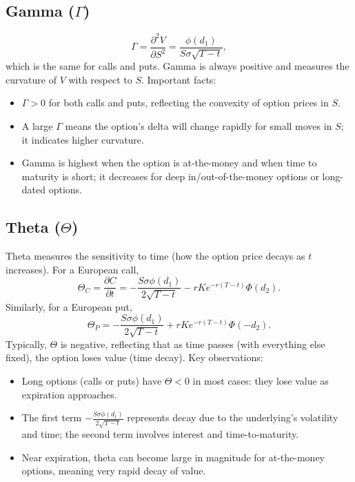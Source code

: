 \subsection{Gamma (\(\Gamma\))}
\[
\Gamma = \frac{\partial^2 V}{\partial S^2} 
= \frac{\phi(d_1)}{S \sigma \sqrt{T-t}},
\]
which is the same for calls and puts.  Gamma is always positive and measures the curvature of \(V\) with respect to \(S\).  Important facts:
\begin{itemize}
    \item \(\Gamma > 0\) for both calls and puts, reflecting the convexity of option prices in \(S\).
    \item A large \(\Gamma\) means the option's delta will change rapidly for small moves in \(S\); it indicates higher curvature.
    \item Gamma is highest when the option is at-the-money and when time to maturity is short; it decreases for deep in/out-of-the-money options or long-dated options.
\end{itemize}

\subsection{Theta (\(\Theta\))}
Theta measures the sensitivity to time (how the option price decays as \(t\) increases).  For a European call,
\[
\Theta_C = \frac{\partial C}{\partial t}
= -\frac{S\sigma\phi(d_1)}{2\sqrt{T-t}} - rK e^{-r(T-t)}\Phi(d_2).
\]
Similarly, for a European put,
\[
\Theta_P = -\frac{S\sigma\phi(d_1)}{2\sqrt{T-t}} + rK e^{-r(T-t)}\Phi(-d_2).
\]
Typically, \(\Theta\) is negative, reflecting that as time passes (with everything else fixed), the option loses value (time decay).  Key observations:
\begin{itemize}
    \item Long options (calls or puts) have \(\Theta < 0\) in most cases: they lose value as expiration approaches.
    \item The first term \(-\frac{S\sigma\phi(d_1)}{2\sqrt{T-t}}\) represents decay due to the underlying's volatility and time; the second term involves interest and time-to-maturity.
    \item Near expiration, theta can become large in magnitude for at-the-money options, meaning very rapid decay of value.
\end{itemize}

